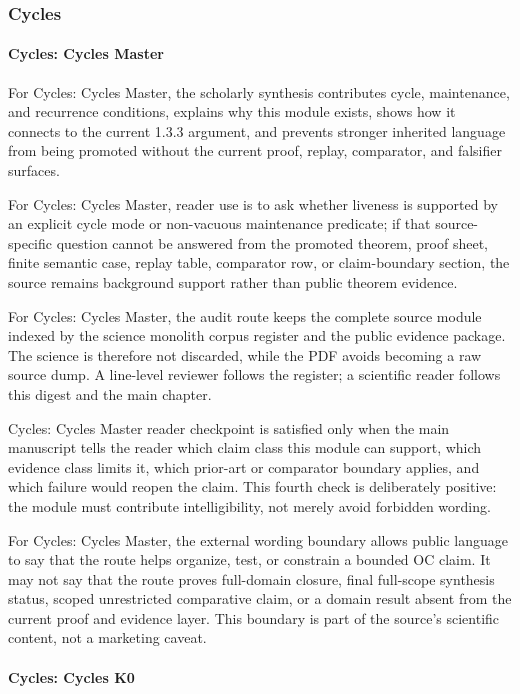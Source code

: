 \subsubsection{Cycles}

\paragraph{Cycles: Cycles Master}

For Cycles: Cycles Master, the scholarly synthesis contributes cycle, maintenance, and recurrence conditions, explains why this module exists, shows how it connects to the current 1.3.3 argument, and prevents stronger inherited language from being promoted without the current proof, replay, comparator, and falsifier surfaces.


For Cycles: Cycles Master, reader use is to ask whether liveness is supported by an explicit cycle mode or non-vacuous maintenance predicate; if that source-specific question cannot be answered from the promoted theorem, proof sheet, finite semantic case, replay table, comparator row, or claim-boundary section, the source remains background support rather than public theorem evidence.


For Cycles: Cycles Master, the audit route keeps the complete source module indexed by the science monolith corpus register and the public evidence package. The science is therefore not discarded, while the PDF avoids becoming a raw source dump. A line-level reviewer follows the register; a scientific reader follows this digest and the main chapter.


Cycles: Cycles Master reader checkpoint is satisfied only when the main manuscript tells the reader which claim class this module can support, which evidence class limits it, which prior-art or comparator boundary applies, and which failure would reopen the claim. This fourth check is deliberately positive: the module must contribute intelligibility, not merely avoid forbidden wording.


For Cycles: Cycles Master, the external wording boundary allows public language to say that the route helps organize, test, or constrain a bounded OC claim. It may not say that the route proves full-domain closure, final full-scope synthesis status, scoped unrestricted comparative claim, or a domain result absent from the current proof and evidence layer. This boundary is part of the source's scientific content, not a marketing caveat.


\paragraph{Cycles: Cycles K0}


